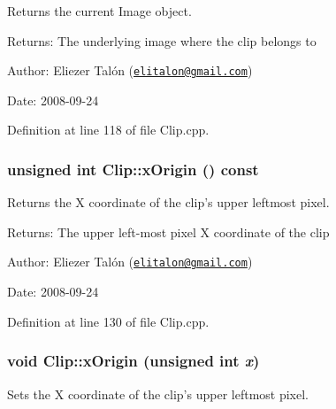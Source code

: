 Returns the current Image object. 

\begin{Desc}
\item[Returns:]The underlying image where the clip belongs to\end{Desc}
\begin{Desc}
\item[Author:]Eliezer Talón (\href{mailto:elitalon@gmail.com}{\tt elitalon@gmail.com}) \end{Desc}
\begin{Desc}
\item[Date:]2008-09-24 \end{Desc}


Definition at line 118 of file Clip.cpp.\hypertarget{class_clip_6965fb65870eeb239c8a829444bb4ed7}{
\subsubsection[xOrigin]{\setlength{\rightskip}{0pt plus 5cm}unsigned int Clip::xOrigin () const}}
\label{class_clip_6965fb65870eeb239c8a829444bb4ed7}


Returns the X coordinate of the clip's upper leftmost pixel. 

\begin{Desc}
\item[Returns:]The upper left-most pixel X coordinate of the clip\end{Desc}
\begin{Desc}
\item[Author:]Eliezer Talón (\href{mailto:elitalon@gmail.com}{\tt elitalon@gmail.com}) \end{Desc}
\begin{Desc}
\item[Date:]2008-09-24 \end{Desc}


Definition at line 130 of file Clip.cpp.\hypertarget{class_clip_59bed794f674858a9ca02fce36c58fac}{
\subsubsection[xOrigin]{\setlength{\rightskip}{0pt plus 5cm}void Clip::xOrigin (unsigned int {\em x})}}
\label{class_clip_59bed794f674858a9ca02fce36c58fac}


Sets the X coordinate of the clip's upper leftmost pixel. 

